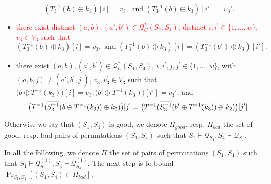 \begin{definition}
\begin{itemize}
		$$\left(T_{3}^{-1}\left(b\right) \oplus k_{3}\right)[i] = v_3,\text{ and }
		\left(T_{3}^{-1}\left(b\right) \oplus k_{3}\right)[i'] = v_3'.$$
		\item[\ceight]
		\textcolor{red}{there exist distinct $(a, b),(a',b') \in \mathcal{Q}_{C}^{*}\left(S_{1}, S_{4}\right)$, distinct $i, i^{\prime}\in\{1, \ldots, w\}$, $v_{3} \in V_{3}$ such that}
		$$\left(T_{3}^{-1}\left(b\right) \oplus k_{3}\right)[i] = v_3,\text{ and }
		\left(T_{3}^{-1}\left(b\right) \oplus k_{3}\right)[i] =\left(T_{3}^{-1}\left(b'\right) \oplus k_{3}\right)[i'].$$
		\item[\cnine]
		there exist $(a, b), (a^{\prime}, b^{\prime}) \in \mathcal{Q}_{C}^{*}\left(S_{1}, S_{4}\right)$, $i, i^{\prime}, j, j^{\prime} \in\{1, \ldots, w\}$, with $(a,b, j) \neq \left(a',b^{\prime}, j^{\prime}\right)$, $v_{3},v_{3}^{\prime} \in V_{3}$ such that $\big(b \oplus T^{-1}(k_3)\big)[i] = v_3, \big(b' \oplus T^{-1}(k_3)\big)[i'] = v_3'$, and
		$$\big(T^{-1}(\overline{S_3^{-1}}(b \oplus T^{-1}(k_3))\oplus k_2)\big)[j]=\big(T^{-1}(\overline{S_3^{-1}}(b' \oplus T^{-1}(k_3))\oplus k_2)\big)[j'].
		$$
	\end{itemize}
	Otherwise we say that $(S_{1}, S_{4})$ is good, we denote $\Pi_{good}$, resp. $\Pi_{bad}$ the set of good, resp. bad pairs of permutations $(S_{1}, S_{4})$ such that $S_{1} \vdash \mathcal{Q}_{S_{1}}, S_{4} \vdash \mathcal{Q}_{S_{4}}$.
\end{definition}




In all the following, we denote \emph{$\Pi$} the set of pairs of permutations $(S_{1}, S_{4})$ such that $S_{1} \vdash \mathcal{Q}_{S_{1}}^{(1)}, S_{4} \vdash \mathcal{Q}_{S_{4}}^{(1)}$. The next step is to bound $\operatorname{Pr}_{S_1,S_4}[(S_1,S_4) \in \Pi_{bad}]$.

